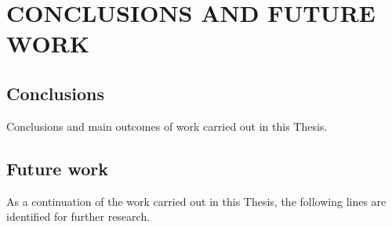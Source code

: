 \part{CONCLUSIONS AND FUTURE WORK}
\label{part:conclusions}

\chapter{Conclusions}
\label{sect:conclusions}

Conclusions and main outcomes of work carried out in this Thesis.

\chapter{Future work}
\label{sect:future_work}

As a continuation of the work carried out in this Thesis, the following lines are identified for further research.
